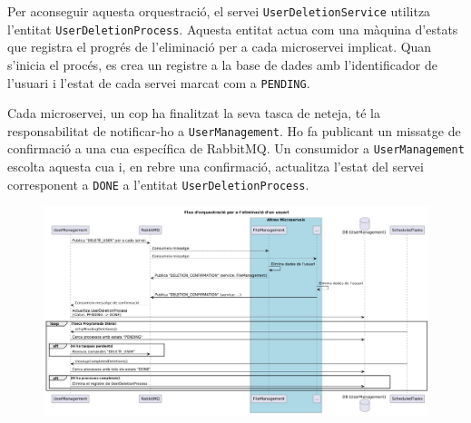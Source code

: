 Per aconseguir aquesta orquestració, el servei \texttt{UserDeletionService} utilitza l'entitat \texttt{UserDeletionProcess}. Aquesta entitat actua com una màquina d'estats que registra el progrés de l'eliminació per a cada microservei implicat. Quan s'inicia el procés, es crea un registre a la base de dades amb l'identificador de l'usuari i l'estat de cada servei marcat com a \texttt{PENDING}.

Cada microservei, un cop ha finalitzat la seva tasca de neteja, té la responsabilitat de notificar-ho a \texttt{UserManagement}. Ho fa publicant un missatge de confirmació a una cua específica de RabbitMQ. Un consumidor a \texttt{UserManagement} escolta aquesta cua i, en rebre una confirmació, actualitza l'estat del servei corresponent a \texttt{DONE} a l'entitat \texttt{UserDeletionProcess}.

\begin{figure}[H]
    \centering
    \includegraphics[width=\textwidth]{Figures/flux/delete_user_async.png}
\end{figure}

